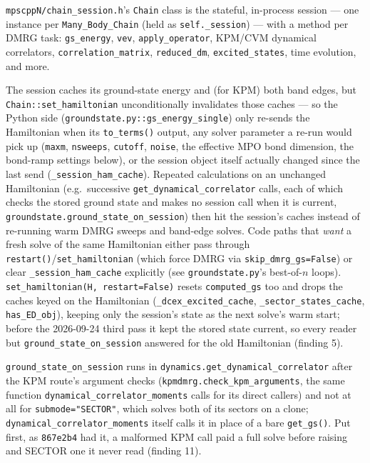 \documentclass[11pt]{article}
\begin{document}
\texttt{mpscppN/chain\_session.h}'s \texttt{Chain} class is the stateful,
in-process session --- one instance per \texttt{Many\_Body\_Chain} (held
as \texttt{self.\_session}) --- with a method per DMRG task:
\texttt{gs\_energy}, \texttt{vev}, \texttt{apply\_operator}, KPM/CVM
dynamical correlators, \texttt{correlation\_matrix}, \texttt{reduced\_dm},
\texttt{excited\_states}, time evolution, and more.

The session caches its ground-state energy and (for KPM) both band
edges, but \texttt{Chain::set\_hamiltonian} unconditionally invalidates
those caches --- so the Python side
(\texttt{groundstate.py::gs\_energy\_single}) only re-sends the
Hamiltonian when its \texttt{to\_terms()} output, any solver parameter
a re-run would pick up (\texttt{maxm}, \texttt{nsweeps},
\texttt{cutoff}, \texttt{noise}, the effective MPO bond dimension, the
bond-ramp settings below), or
the session object itself actually changed since the last send
(\texttt{\_session\_ham\_cache}). Repeated calculations
on an unchanged Hamiltonian (e.g.\ successive
\texttt{get\_dynamical\_correlator} calls, each of which checks the
stored ground state and makes no session call when it is current,
\texttt{groundstate.ground\_state\_on\_session}) then hit the session's caches instead of re-running
warm DMRG sweeps and band-edge solves. Code paths that \emph{want} a
fresh solve of the same Hamiltonian either pass through
\texttt{restart()}/\texttt{set\_hamiltonian} (which force DMRG via
\texttt{skip\_dmrg\_gs=False}) or clear \texttt{\_session\_ham\_cache}
explicitly (see \texttt{groundstate.py}'s best-of-$n$ loops).
\texttt{set\_hamiltonian(H, restart=False)} resets \texttt{computed\_gs}
too and drops the caches keyed on the Hamiltonian
(\texttt{\_dcex\_excited\_cache}, \texttt{\_sector\_states\_cache},
\texttt{has\_ED\_obj}), keeping only the session's state as the next
solve's warm start; before the 2026-09-24 third pass it kept the stored
state current, so every reader but \texttt{ground\_state\_on\_session}
answered for the old Hamiltonian (finding 5).

\texttt{ground\_state\_on\_session} runs in
\texttt{dynamics.get\_dynamical\_correlator} after the KPM route's
argument checks (\texttt{kpmdmrg.check\_kpm\_arguments}, the same function
\texttt{dynamical\_correlator\_moments} calls for its direct callers) and
not at all for \texttt{submode="SECTOR"}, which solves both of its
sectors on a clone; \texttt{dynamical\_correlator\_moments} itself calls
it in place of a bare \texttt{get\_gs()}. Put first, as \texttt{867e2b4}
had it, a malformed KPM call paid a full solve before raising and SECTOR
one it never read (finding 11).
\end{document}
